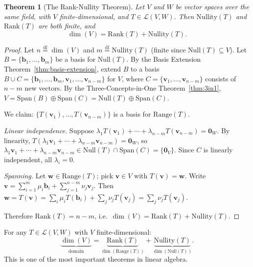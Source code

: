 \documentclass[11pt, a4paper, notitlepage]{report}
\newtheorem{theorem}{Theorem}[section]
\theoremstyle{definition}
\theoremstyle{remark}
\begin{document}
\begin{theorem}[The Rank-Nullity Theorem]\label{thm:rank-nullity}
Let $V$ and $W$ be vector spaces over the same field, with $V$ finite-dimensional, and
$T \in \mathcal{L}(V,W)$. Then $\mathrm{Nullity}(T)$ and $\mathrm{Rank}(T)$ are both finite, and
\[
  \dim(V) = \mathrm{Rank}(T) + \mathrm{Nullity}(T).
\]
\end{theorem}
\begin{proof}
Let $n \stackrel{\mathrm{df}}{=} \dim(V)$ and $m \stackrel{\mathrm{df}}{=} \mathrm{Nullity}(T)$ (finite since $\mathrm{Null}(T) \subseteq V$).
Let $B = \{\mathbf{b}_1, \ldots, \mathbf{b}_m\}$ be a basis for $\mathrm{Null}(T)$.
By the Basis Extension Theorem~\ref{thm:basis-extension}, extend $B$ to a basis
$B \cup C = \{\mathbf{b}_1,\ldots,\mathbf{b}_m, \mathbf{v}_1, \ldots, \mathbf{v}_{n-m}\}$ for $V$,
where $C = \{\mathbf{v}_1, \ldots, \mathbf{v}_{n-m}\}$ consists of $n-m$ new vectors.
By the Three-Concepts-in-One Theorem~\ref{thm:3in1},
$V = \mathrm{Span}(B) \oplus \mathrm{Span}(C) = \mathrm{Null}(T) \oplus \mathrm{Span}(C)$.

We claim: $\{T(\mathbf{v}_1), \ldots, T(\mathbf{v}_{n-m})\}$ is a basis for $\mathrm{Range}(T)$.

\emph{Linear independence.} Suppose $\lambda_1 T(\mathbf{v}_1) + \cdots + \lambda_{n-m} T(\mathbf{v}_{n-m}) = \mathbf{0}_W$.
By linearity, $T(\lambda_1\mathbf{v}_1 + \cdots + \lambda_{n-m}\mathbf{v}_{n-m}) = \mathbf{0}_W$, so
$\lambda_1\mathbf{v}_1 + \cdots + \lambda_{n-m}\mathbf{v}_{n-m} \in \mathrm{Null}(T) \cap \mathrm{Span}(C) = \{\mathbf{0}_V\}$.
Since $C$ is linearly independent, all $\lambda_i = 0$.

\emph{Spanning.} Let $\mathbf{w} \in \mathrm{Range}(T)$; pick $\mathbf{v} \in V$ with $T(\mathbf{v}) = \mathbf{w}$.
Write $\mathbf{v} = \sum_{i=1}^m \mu_i \mathbf{b}_i + \sum_{j=1}^{n-m} \nu_j \mathbf{v}_j$. Then
$\mathbf{w} = T(\mathbf{v}) = \sum_i \mu_i T(\mathbf{b}_i) + \sum_j \nu_j T(\mathbf{v}_j) = \sum_j \nu_j T(\mathbf{v}_j)$.

Therefore $\mathrm{Rank}(T) = n - m$, i.e.\ $\dim(V) = \mathrm{Rank}(T) + \mathrm{Nullity}(T)$.
\end{proof}

\begin{keyresult}[title={Key Result: Rank-Nullity Theorem}]
For any $T \in \mathcal{L}(V,W)$ with $V$ finite-dimensional:
\[
  \underbrace{\dim(V)}_{\text{domain}} = \underbrace{\mathrm{Rank}(T)}_{\dim(\mathrm{Range}(T))} + \underbrace{\mathrm{Nullity}(T)}_{\dim(\mathrm{Null}(T))}.
\]
This is one of the most important theorems in linear algebra.
\end{keyresult}
\end{document}
